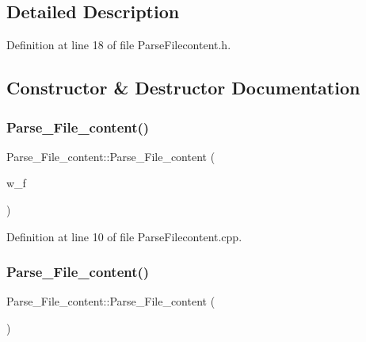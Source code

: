 \subsection{Detailed Description}


Definition at line 18 of file Parse\+Filecontent.\+h.



\subsection{Constructor \& Destructor Documentation}
\mbox{\label{class_parse___file__content_a1f24218f4f9a445f020381139bb7dc9f}} 
\subsubsection{\texorpdfstring{Parse\+\_\+\+File\+\_\+content()}{Parse\_File\_content()}\hspace{0.1cm}{\footnotesize\ttfamily [1/2]}}
{\footnotesize\ttfamily Parse\+\_\+\+File\+\_\+content\+::\+Parse\+\_\+\+File\+\_\+content (\begin{DoxyParamCaption}\item[{\mbox{\hyperlink{class_file_handler}{File\+Handler}}}]{w\+\_\+f }\end{DoxyParamCaption})}



Definition at line 10 of file Parse\+Filecontent.\+cpp.

\mbox{\label{class_parse___file__content_a559ef5526225c22747225d5805ebcd86}} 
\subsubsection{\texorpdfstring{Parse\+\_\+\+File\+\_\+content()}{Parse\_File\_content()}\hspace{0.1cm}{\footnotesize\ttfamily [2/2]}}
{\footnotesize\ttfamily Parse\+\_\+\+File\+\_\+content\+::\+Parse\+\_\+\+File\+\_\+content (\begin{DoxyParamCaption}{ }\end{DoxyParamCaption})}



